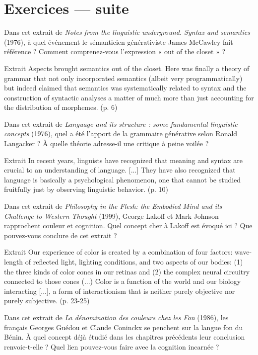 \section*{Exercices — suite}
Dans cet extrait de \emph{Notes from the linguistic underground. Syntax and semantics} (1976), à quel événement le sémanticien générativiste James McCawley fait référence ? Comment comprenez-vous l’expression « out of the closet » ?
\begin{lecture}{Extrait}
Aspects brought semantics out of the closet. Here was finally a theory of grammar that not only incorporated semantics (albeit very programmatically) but indeed claimed that semantics was systematically related to syntax and the construction of syntactic analyses a matter of much more than just accounting for the distribution of morphemes. (p. 6)
\end{lecture}
Dans cet extrait de \emph{Language and its structure : some fundamental linguistic concepts} (1976), quel a été l’apport de la grammaire générative selon Ronald Langacker ? À quelle théorie adresse-il une critique à peine voilée ?
\begin{lecture}{Extrait}
In recent years, linguists have recognized that meaning and syntax are crucial to an understanding of language. [...] They have also recognized that language is basically a psychological phenomenon, one that cannot be studied fruitfully just by observing linguistic behavior. (p. 10)
\end{lecture}
Dans cet extrait de \emph{Philosophy in the Flesh: the Embodied Mind and its Challenge to Western Thought} (1999), George Lakoff et Mark Johnson rapprochent couleur et cognition. Quel concept cher à Lakoff est évoqué ici ? Que pouvez-vous conclure de cet extrait ?
\begin{lecture}{Extrait}
Our experience of color is created by a combination of four factors: wave-length of reflected light, lighting conditions, and two aspects of our bodies: (1) the three kinds of color cones in our retinas and (2) the complex neural circuitry connected to those cones (...) Color is a function of the world and our biology interacting [...], a form of interactionism that is neither purely objective nor purely subjective. (p. 23-25)
\end{lecture}
Dans cet extrait de \emph{La dénomination des couleurs chez les Fon} (1986), les français Georges Guédou et Claude Coninckx se penchent sur la langue fon du Bénin. À quel concept déjà étudié dans les chapitres précédents leur conclusion renvoie-t-elle ? Quel lien pouvez-vous faire avec la cognition incarnée ?
